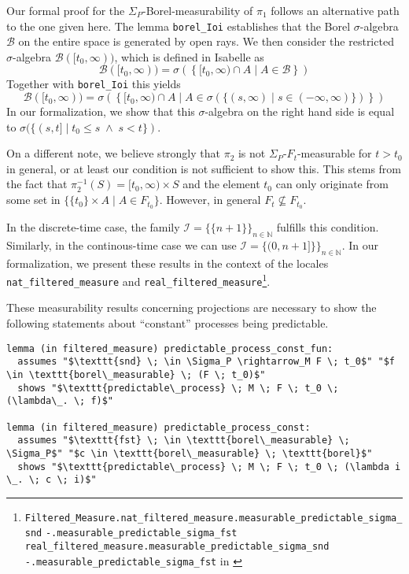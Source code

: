 \begin{remark}
	Our formal proof for the $\Sigma_P$-Borel-measurability of $\pi_1$ follows an alternative path to the one given here. The lemma \texttt{borel\_Ioi} establishes that the Borel $\sigma$-algebra  $\mathcal{B}$ on the entire space is generated by open rays. We then consider the restricted $\sigma$-algebra $\mathcal{B}([t_0,\infty))$, which is defined in Isabelle as
	\[
		\mathcal{B}([t_0,\infty)) = \sigma\left(\left\{[t_0, \infty) \cap A \;\vert\; A \in \mathcal{B}\right\}\right)
	\]
	Together with \texttt{borel\_Ioi} this yields
	\[
	 	\mathcal{B}([t_0,\infty)) = \sigma\left(\left\{[t_0, \infty) \cap A \;\vert\; A \in \sigma(\{(s,\infty) \;\vert\; s \in (-\infty,\infty)\})\right\}\right)
	\]
	In our formalization, we show that this $\sigma$-algebra on the right hand side is equal to $\sigma(\{(s,t] \;\vert\; t_0 \le s \;\wedge\; s < t\})$.
	
	On a different note, we believe strongly that $\pi_2$ is not $\Sigma_P$-$F_t$-measurable for $t > t_0$ in general, or at least our condition is not sufficient to show this. This stems from the fact that $\pi_2^{-1}(S) = [t_0, \infty) \times S$ and the element $t_0$ can only originate from some set in $\{\{t_0\} \times A \;\vert\; A \in F_{t_0}\}$. However, in general $F_t \not\subseteq F_{t_0}$.
\end{remark}

In the discrete-time case, the family $\mathcal{I} = \{\{n + 1\}\}_{n \in \mathbb{N}}$ fulfills this condition. Similarly, in the continous-time case we can use $\mathcal{I} = \{(0,n + 1]\}\}_{n \in \mathbb{N}}$. In our formalization, we present these results in the context of the locales \texttt{nat\_filtered\_measure} and \texttt{real\_filtered\_measure}\footnote{\texttt{Filtered\_Measure.nat\_filtered\_measure.measurable\_predictable\_sigma\_snd} \quad \texttt{-.measurable\_predictable\_sigma\_fst} \\\texttt{real\_filtered\_measure.measurable\_predictable\_sigma\_snd} \quad \texttt{-.measurable\_predictable\_sigma\_fst} in \cite{Keskin_A_Formalization_of_2023}}.

These measurability results concerning projections are necessary to show the following statements about ``constant'' processes being predictable.

\begin{isalemma}
{\small
\begin{lstlisting}[style=isabelle]
lemma (in filtered_measure) predictable_process_const_fun:
  assumes "$\texttt{snd} \; \in \Sigma_P \rightarrow_M F \; t_0$" "$f \in \texttt{borel\_measurable} \; (F \; t_0)$"
  shows "$\texttt{predictable\_process} \; M \; F \; t_0 \; (\lambda\_. \; f)$"

lemma (in filtered_measure) predictable_process_const:
  assumes "$\texttt{fst} \; \in \texttt{borel\_measurable} \; \Sigma_P$" "$c \in \texttt{borel\_measurable} \; \texttt{borel}$"
  shows "$\texttt{predictable\_process} \; M \; F \; t_0 \; (\lambda i \_. \; c \; i)$"
\end{lstlisting}
}
\end{isalemma}


